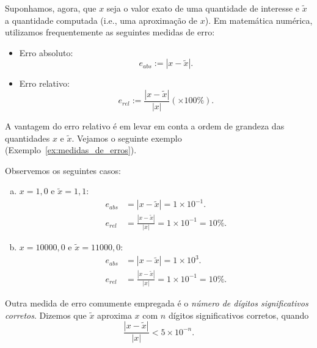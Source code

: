 Suponhamos, agora, que $x$ seja o valor exato de uma quantidade de interesse e $\tilde{x}$ a quantidade computada (i.e., uma aproximação de $x$). Em matemática numérica, utilizamos frequentemente as seguintes medidas de erro:
\begin{itemize}
  \item Erro absoluto:
    \begin{equation}
      e_{abs} := |x - \tilde{x}|.
    \end{equation}
  \item Erro relativo:
    \begin{equation}
      e_{rel} := \frac{|x - \tilde{x}|}{|x|}\left(\times 100\%\right).
    \end{equation}
\end{itemize}

A vantagem do erro relativo é em levar em conta a ordem de grandeza das quantidades $x$ e $\tilde{x}$. Vejamos o seguinte exemplo (Exemplo~\ref{ex:medidas_de_erros}).

\begin{ex}\label{ex:medidas_de_erros}
  Observemos os seguintes casos:
  \begin{enumerate}[a)]
  \item $x=1,0$ e $\tilde{x} = 1,1$:
    \begin{align}
      e_{abs} &= |x - \tilde{x}| = 1\times 10^{-1}.\\
      e_{rel} &= \frac{|x - \tilde{x}|}{|x|} = 1\times 10^{-1} = 10\%.
    \end{align}
  \item $x=10000,0$ e $\tilde{x} = 11000,0$:
    \begin{align}
      e_{abs} &= |x - \tilde{x}| = 1\times 10^3.\\
      e_{rel} &= \frac{|x - \tilde{x}|}{|x|} = 1\times 10^{-1} = 10\%.
    \end{align}
  \end{enumerate}
\end{ex}

Outra medida de erro comumente empregada é o \emph{número de dígitos significativos corretos}. Dizemos que $\tilde{x}$ aproxima $x$ com $n$ dígitos significativos corretos, quando
\begin{equation}
  \frac{|x - \tilde{x}|}{|x|} < 5\times 10^{-n}.
\end{equation}

